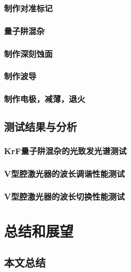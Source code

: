 \documentclass[oneside]{ZJUthesis}
\begin{document}
\subsection{制作对准标记}

\subsection{量子阱混杂}

\subsection{制作深刻蚀面}

\subsection{制作波导}

\subsection{制作电极，减薄，退火}

\section{测试结果与分析}

\subsection{KrF量子阱混杂的光致发光谱测试}

\subsection{V型腔激光器的波长调谐性能测试}

\subsection{V型腔激光器的波长切换性能测试}

\chapter{总结和展望}

\section{本文总结}
\end{document}
